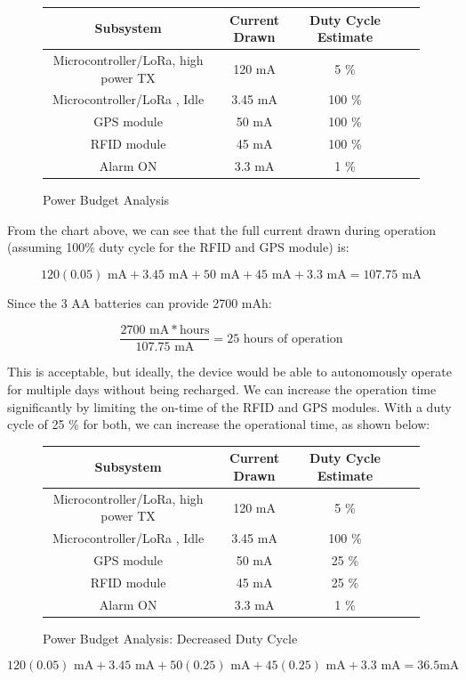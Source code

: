 \documentclass{article}
\begin{document}
\begin{figure}[H]
	\begin{center}
		\begin{tabular}{|c|c|c|c|c|}
			\hline
			\textbf{Subsystem} &  \textbf{Current Drawn} & \textbf{Duty Cycle Estimate} \\
			\hline
			Microcontroller/LoRa, high power TX \cite{stm_datasheet} & 120 mA & 5 \% \\
			\hline
			Microcontroller/LoRa \cite{stm_datasheet}, Idle & 3.45 mA & 100 \% \\
			\hline 
			GPS module \cite{gps} & 50 mA & 100 \% \\
			\hline
			RFID module \cite{rfid} & 45 mA & 100 \% \\ 
			\hline 
			Alarm ON & 3.3 mA & 1 \% \\ 
			\hline
			
			
		\end{tabular}
	\end{center}
	\caption{Power Budget Analysis}
\end{figure}

From the chart above, we can see that the full current drawn during operation (assuming 100\% duty cycle for the RFID and GPS module) is: 

$$ 
120(0.05) \text{ mA}+ 3.45 \text{ mA}+ 50\text{ mA} + 45\text{ mA} + 3.3 \text{ mA}= 107.75 \text{ mA}
$$


Since the 3 AA batteries can provide 2700 mAh: 

$$ 
\frac{2700 \text{ mA}*\text{hours}}{107.75 \text{ mA} } = 25 \text{ hours of operation}
$$


This is acceptable, but ideally, the device would be able to autonomously operate for multiple days without being recharged. We can increase the operation time significantly by limiting the on-time of the RFID and GPS modules. With a duty cycle of 25 \% for both, we can increase the operational time, as shown below: 
\begin{figure}[H]
	\begin{center}
		\begin{tabular}{|c|c|c|c|c|}
			\hline
			\textbf{Subsystem} &  \textbf{Current Drawn} & \textbf{Duty Cycle Estimate} \\
			\hline
			Microcontroller/LoRa, high power TX \cite{stm_datasheet} & 120 mA & 5 \% \\
			\hline
			Microcontroller/LoRa \cite{stm_datasheet}, Idle & 3.45 mA & 100 \% \\
			\hline 
			GPS module \cite{gps} & 50 mA & 25 \% \\
			\hline
			RFID module \cite{rfid} & 45 mA & 25 \% \\ 
			\hline 
			Alarm ON & 3.3 mA & 1 \% \\ 
			\hline
			
			
		\end{tabular}
	\end{center}
	\caption{Power Budget Analysis: Decreased Duty Cycle}
\end{figure}
$$ 
120(0.05)\text{ mA} + 3.45\text{ mA} + 50(0.25) \text{ mA}+ 45(0.25) \text{ mA}+ 3.3 \text{ mA}= 36.5 \text{mA}
$$
\end{document}

